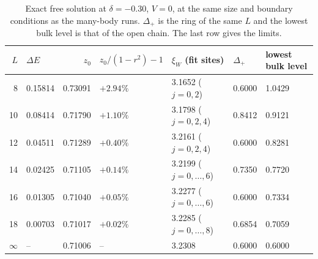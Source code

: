 \documentclass[11pt,a4paper]{article}
\begin{document}
\begin{table}[h]
  \centering
  \footnotesize
  \begin{tabular}{rlrllll}
    \toprule
    $L$ & $\Delta E$ & $z_0$ & $z_0/(1-r^2)-1$ & $\xi_W$ (fit sites) & $\Delta_+$ & lowest bulk level \\
    \midrule
    8  & 0.15814 & 0.73091 & $+2.94\%$ & 3.1652 ($j=0,2$) & 0.6000 & 1.0429 \\
    10 & 0.08414 & 0.71790 & $+1.10\%$ & 3.1798 ($j=0,2,4$) & 0.8412 & 0.9121 \\
    12 & 0.04511 & 0.71289 & $+0.40\%$ & 3.2161 ($j=0,2,4$) & 0.6000 & 0.8281 \\
    14 & 0.02425 & 0.71105 & $+0.14\%$ & 3.2199 ($j=0,\dots,6$) & 0.7350 & 0.7720 \\
    16 & 0.01305 & 0.71040 & $+0.05\%$ & 3.2277 ($j=0,\dots,6$) & 0.6000 & 0.7334 \\
    18 & 0.00703 & 0.71017 & $+0.02\%$ & 3.2285 ($j=0,\dots,8$) & 0.6854 & 0.7059 \\
    \midrule
    $\infty$ & -- & 0.71006 & -- & 3.2308 & 0.6000 & 0.6000 \\
    \bottomrule
  \end{tabular}
  \caption{Exact free solution at $\delta=-0.30$, $V=0$, at the same size and boundary conditions as the many-body runs.
  $\Delta_+$ is the ring of the same $L$ and the lowest bulk level is that of the open chain.
  The last row gives the limits.}
  \label{tab:bench}
\end{table}
\end{document}
